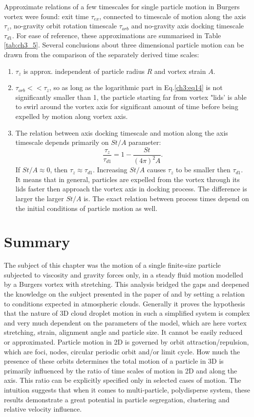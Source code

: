 \documentclass[../main.tex]{subfiles}
\begin{document}
Approximate relations of a few timescales for single particle motion in Burgers vortex were found: exit time $\tau_{ex}$, connected to timescale of motion along the axis $\tau_z$, no-gravity orbit rotation timescale $\tau_{orb}$ and no-gravity axis docking timescale $\tau_{d1}$. For ease of reference, these approximations are summarised in Table \ref{tab:ch3_5}. Several conclusions about three dimensional particle motion can be drawn from the comparison of the separately derived time scales:
\begin{enumerate}
\item $\tau_z$ is approx. independent of particle radius $R$ and vortex strain $A$.
\item $\tau_{orb}<<\tau_z$, so as long as the logarithmic part in Eq.\ref{ch3:eq14} is not significantly smaller than 1, the particle starting far from vortex "lids' is able to swirl around the vortex axis for significant amount of time before being expelled by motion along vortex axis.
\item The relation between axis docking timescale and motion along the axis timescale depends primarily on $St/A$ parameter:
\begin{equation}
\frac{\tau_z}{\tau_{d1}} = 1-\frac{St}{(4 \pi)^2 A}.
\label{ch3:eq33}
\end{equation}
If $St/A \approx 0$, then $\tau_z \approx \tau_{d1}$. Increasing $St/A$ causes $\tau_z$ to be smaller then $\tau_{d1}$. It means that in general, particles are expelled from the vortex  through its lids faster then approach the vortex axis in docking process. The difference is larger the larger $St/A$ is. The exact relation between process times depend on the initial conditions of particle motion as well.
\end{enumerate} 

\section{Summary}
The subject of this chapter was the motion of a single finite-size particle subjected to viscosity and gravity forces only, in a steady fluid motion modelled by a Burgers vortex with stretching. This analysis bridged the gaps and deepened the knowledge on the subject presented in the paper of \citet{Marcu1995} and by setting a relation to conditions expected in atmospheric clouds.
Generally it proves the hypothesis that the nature of 3D cloud droplet motion in such a simplified system is complex and very much dependent on the parameters of the model, which are here vortex stretching, strain, alignment angle and particle size. It cannot be easily reduced or approximated. Particle motion in 2D is governed by orbit attraction/repulsion, which are foci, nodes, circular periodic orbit and/or limit cycle. How much the presence of these orbits determines the total motion of a particle in 3D is primarily influenced by the ratio of time scales of motion in 2D and along the axis. This ratio can be explicitly specified only in selected cases of motion. The intuition suggests that when it comes to multi-particle, polydisperse system, these results demonstrate a great potential in particle segregation, clustering and relative velocity influence.
\end{document}
